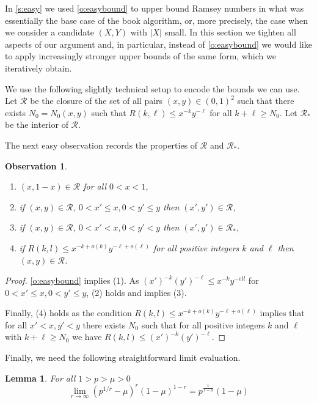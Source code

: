 \documentclass[reqno,final,12pt]{amsart}
\newtheorem{lem}[thm]{Lemma}
\newtheorem{obs}[thm]{Observation}
\newcommand{\mc}[1]{\mathcal{#1}}
\begin{document}
In \cref{s:easy} we used \cref{o:easybound} to upper bound Ramsey numbers in what was essentially the base case of the book algorithm, or, more precisely, the case when we consider a candidate $(X,Y)$ with $|X|$ small. In this section we tighten all aspects of our argument and, in  particular, instead of \cref{o:easybound} we would like to apply increasingly stronger upper bounds of the same form, which we iteratively obtain.

We use the following slightly technical setup to encode the bounds we can use. 
Let $\mc{R}$ be the closure of the set of all pairs $(x,y) \in (0,1)^2$ such that there exists $N_0=N_0(x,y)$ such that $R(k,\ell) \leq x^{-k}y^{-\ell}$ for all $k+\ell \geq N_0$. Let $\mc{R_*}$ be the interior of $\mc{R}$.

The next easy observation records the properties of $\mc{R}$ and $\mc{R_*}$.

\begin{obs}\label{o:r}
	\begin{enumerate}
		\item $(x,1-x) \in \mc{R}$ for all $0<x<1$,
		\item if  $(x,y) \in \mc{R}$, $0 < x' \leq x, 0 < y' \leq y$  then $(x',y') \in \mc{R}$,
		\item if  $(x,y) \in \mc{R}$, $0 < x' < x, 0 < y'< y$  then $(x',y') \in \mc{R}_*$,
		\item if $R(k,l) \leq x^{-k+o(k)}y^{-\ell+o(\ell)}$ for all positive integers $k$ and $\ell$ then $(x,y) \in \mc{R}$.
	\end{enumerate}	
\end{obs}	

\begin{proof}
\cref{o:easybound} implies (1). As $ (x')^{-k}(y')^{-\ell} \leq x^{-k}y^{-ell}$ for $0 < x' \leq x, 0 < y' \leq y$, (2) holds and implies (3). 

Finally, (4) holds as the condition $R(k,l) \leq x^{-k+o(k)}y^{-\ell+o(\ell)}$ implies that for all $x'<x,y'<y$ there exists $N_0$ such that for all positive integers $k$ and $\ell$ with $k+\ell \geq N_0$ we have $R(k,l) \leq (x')^{-k}(y')^{-\ell}$.
\end{proof}

Finally, we need the following straightforward limit evaluation.

\begin{lem}\label{l:limit} 
	For all $1>  p >  \mu >0$ 
	\begin{equation}\label{e:limit} \lim_{r \to \infty}(p^{1/r}-\mu)^r(1-\mu)^{1-r}=p^{\frac{1}{1-\mu}}(1-\mu)
	\end{equation} 
\end{lem}
\end{document}
